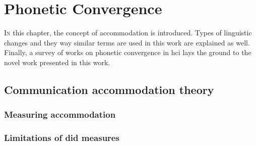 \chapter{Phonetic Convergence}
\label{chap:phonetic_convergence}

\lettrine{I}{n} this chapter, the concept of accommodation is introduced.
Types of linguistic changes and they way similar terms are used in this work are explained as well.
Finally, a survey of works on phonetic convergence in \acl{hci} lays the ground to the novel work presented in this work.

\pagebreak

\section{Communication accommodation theory}
\label{sec:communication_accommodation_theory}

\citet{Racz2020morphological}  %
\citet{Aubanel2020speaking}  %


\subsection{Measuring accommodation}
\label{subsec:measuring_accommodation}

\subsection{Limitations of \acl{did} measures}
\label{subsec:limitations_of_did}




